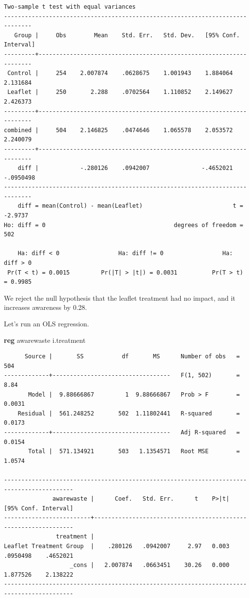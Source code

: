 \documentclass[
]{book}
\newenvironment{Shaded}{\begin{snugshade}}{\end{snugshade}}
\newcommand{\KeywordTok}[1]{\textcolor[rgb]{0.13,0.29,0.53}{\textbf{#1}}}
\newcommand{\NormalTok}[1]{#1}
\begin{document}
\begin{verbatim}
Two-sample t test with equal variances
------------------------------------------------------------------------------
   Group |     Obs        Mean    Std. Err.   Std. Dev.   [95% Conf. Interval]
---------+--------------------------------------------------------------------
 Control |     254    2.007874    .0628675    1.001943    1.884064    2.131684
 Leaflet |     250       2.288    .0702564    1.110852    2.149627    2.426373
---------+--------------------------------------------------------------------
combined |     504    2.146825    .0474646    1.065578    2.053572    2.240079
---------+--------------------------------------------------------------------
    diff |            -.280126    .0942007               -.4652021   -.0950498
------------------------------------------------------------------------------
    diff = mean(Control) - mean(Leaflet)                          t =  -2.9737
Ho: diff = 0                                     degrees of freedom =      502

    Ha: diff < 0                 Ha: diff != 0                 Ha: diff > 0
 Pr(T < t) = 0.0015         Pr(|T| > |t|) = 0.0031          Pr(T > t) = 0.9985
\end{verbatim}

We reject the null hypothesis that the leaflet treatment had no impact, and it increases awareness by 0.28.

Let's run an OLS regression.

\begin{Shaded}
\begin{Highlighting}[]
\KeywordTok{reg}\NormalTok{ awarewaste i.treatment}
\end{Highlighting}
\end{Shaded}

\begin{verbatim}
      Source |       SS           df       MS      Number of obs   =       504
-------------+----------------------------------   F(1, 502)       =      8.84
       Model |  9.88666867         1  9.88666867   Prob > F        =    0.0031
    Residual |  561.248252       502  1.11802441   R-squared       =    0.0173
-------------+----------------------------------   Adj R-squared   =    0.0154
       Total |  571.134921       503   1.1354571   Root MSE        =    1.0574

------------------------------------------------------------------------------------------
              awarewaste |      Coef.   Std. Err.      t    P>|t|     [95% Conf. Interval]
-------------------------+----------------------------------------------------------------
               treatment |
Leaflet Treatment Group  |    .280126   .0942007     2.97   0.003     .0950498    .4652021
                   _cons |   2.007874   .0663451    30.26   0.000     1.877526    2.138222
------------------------------------------------------------------------------------------
\end{verbatim}
\end{document}
